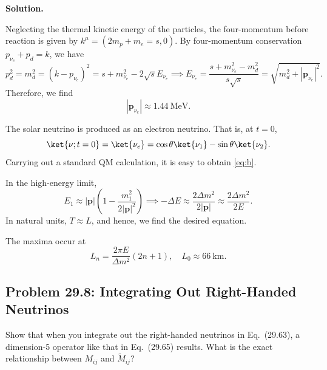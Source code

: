 \documentclass[a4paper,11pt]{article}
\newenvironment{solution}{\par\medskip\noindent\textbf{Solution.}\par\smallskip}{\par\medskip}
\begin{document}
\begin{solution}
    Neglecting the thermal kinetic energy of the particles, the four-momentum before reaction is given by $k^\mu = (2m_p + m_e = s, 0 )$. By four-momentum conservation $p_{\nu_e} + p_d = k$, we have
    \begin{equation}
        p_d^2 = m_d^2 = (k-p_{\nu_e})^2 = s+ m_{\nu_e}^2 -2\sqrt{s}E_{\nu_e} \implies E_{\nu_e} = \frac{s+m_{\nu_e}^2 -m_d^2}{s\sqrt{s}} = \sqrt{m_d^2 +|\mathbf{p}_{\nu_e}|^2}.
    \end{equation}
    Therefore, we find
    \begin{equation}
        |\mathbf{p}_{\nu_e}| \approx 1.44 ~\mathrm{MeV}.
    \end{equation}

    The solar neutrino is produced as an electron neutrino. That is, at $t=0$,
    \begin{equation}
        \ket{\nu;t=0} = \ket{\nu_e} = \cos\theta\ket{\nu_1} - \sin\theta \ket{\nu_2}.
    \end{equation}
    Carrying out a standard QM calculation, it is easy to obtain \eqref{eq:b}.

    In the high-energy limit,
    \begin{equation}
        E_1  \approx |\mathbf{p}|\left(1-\frac{m_1^2}{2|\mathbf{p}|^2}\right) \implies -\Delta E \approx \frac{2\Delta m^2}{2|\mathbf{p}|} \approx \frac{2\Delta m^2}{2E}.
    \end{equation}
    In natural units, $T \approx L$, and hence, we find the desired equation.

    The maxima occur at
    \begin{equation}
        L_n = \frac{2\pi E}{\Delta m^2}(2n+1), \quad L_0 \approx 66 ~\mathrm{km}.
    \end{equation}
\end{solution}

\subsection[Problem 29.8: Integrating out right-handed neutrinos]{Problem 29.8: Integrating Out Right-Handed Neutrinos}

Show that when you integrate out the right-handed neutrinos in Eq.~(29.63), a
dimension-5 operator like that in Eq.~(29.65) results. What is the exact
relationship between $M_{ij}$ and $\widetilde M_{ij}$?
\end{document}
